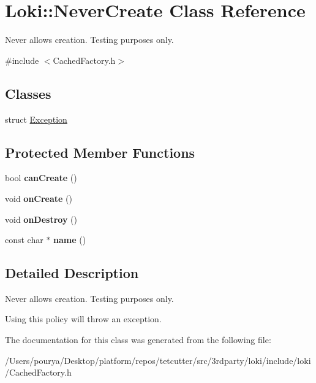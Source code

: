 \hypertarget{classLoki_1_1NeverCreate}{}\section{Loki\+:\+:Never\+Create Class Reference}
\label{classLoki_1_1NeverCreate}


Never allows creation. Testing purposes only.  




{\ttfamily \#include $<$Cached\+Factory.\+h$>$}

\subsection*{Classes}
\begin{DoxyCompactItemize}
\item 
struct \hyperlink{structLoki_1_1NeverCreate_1_1Exception}{Exception}
\end{DoxyCompactItemize}
\subsection*{Protected Member Functions}
\begin{DoxyCompactItemize}
\item 
\hypertarget{classLoki_1_1NeverCreate_a721c77b8798980d7f2728562033386db}{}bool {\bfseries can\+Create} ()\label{classLoki_1_1NeverCreate_a721c77b8798980d7f2728562033386db}

\item 
\hypertarget{classLoki_1_1NeverCreate_ac360e05951ecfea73f557e76a32808b0}{}void {\bfseries on\+Create} ()\label{classLoki_1_1NeverCreate_ac360e05951ecfea73f557e76a32808b0}

\item 
\hypertarget{classLoki_1_1NeverCreate_a7c01df3587354eead5a78b23ac534fb3}{}void {\bfseries on\+Destroy} ()\label{classLoki_1_1NeverCreate_a7c01df3587354eead5a78b23ac534fb3}

\item 
\hypertarget{classLoki_1_1NeverCreate_a32fb9b99996115be09fe61a5b8f5eebc}{}const char $\ast$ {\bfseries name} ()\label{classLoki_1_1NeverCreate_a32fb9b99996115be09fe61a5b8f5eebc}

\end{DoxyCompactItemize}


\subsection{Detailed Description}
Never allows creation. Testing purposes only. 

Using this policy will throw an exception. 

The documentation for this class was generated from the following file\+:\begin{DoxyCompactItemize}
\item 
/\+Users/pourya/\+Desktop/platform/repos/tetcutter/src/3rdparty/loki/include/loki/Cached\+Factory.\+h\end{DoxyCompactItemize}
